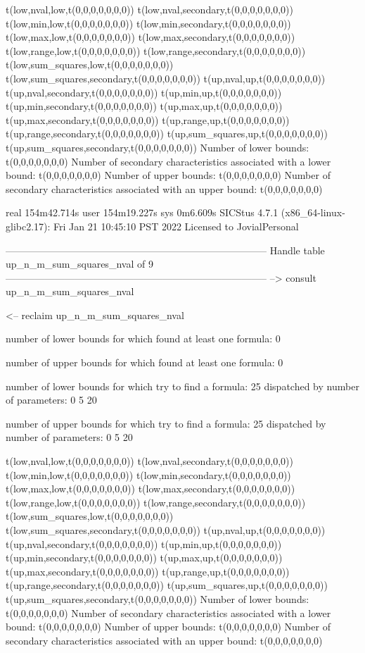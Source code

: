 t(low,nval,low,t(0,0,0,0,0,0,0))
t(low,nval,secondary,t(0,0,0,0,0,0,0))
t(low,min,low,t(0,0,0,0,0,0,0))
t(low,min,secondary,t(0,0,0,0,0,0,0))
t(low,max,low,t(0,0,0,0,0,0,0))
t(low,max,secondary,t(0,0,0,0,0,0,0))
t(low,range,low,t(0,0,0,0,0,0,0))
t(low,range,secondary,t(0,0,0,0,0,0,0))
t(low,sum_squares,low,t(0,0,0,0,0,0,0))
t(low,sum_squares,secondary,t(0,0,0,0,0,0,0))
t(up,nval,up,t(0,0,0,0,0,0,0))
t(up,nval,secondary,t(0,0,0,0,0,0,0))
t(up,min,up,t(0,0,0,0,0,0,0))
t(up,min,secondary,t(0,0,0,0,0,0,0))
t(up,max,up,t(0,0,0,0,0,0,0))
t(up,max,secondary,t(0,0,0,0,0,0,0))
t(up,range,up,t(0,0,0,0,0,0,0))
t(up,range,secondary,t(0,0,0,0,0,0,0))
t(up,sum_squares,up,t(0,0,0,0,0,0,0))
t(up,sum_squares,secondary,t(0,0,0,0,0,0,0))
Number of lower bounds:                                             t(0,0,0,0,0,0,0)
Number of secondary characteristics associated with a lower bound:  t(0,0,0,0,0,0,0)
Number of upper bounds:                                             t(0,0,0,0,0,0,0)
Number of secondary characteristics associated with an upper bound: t(0,0,0,0,0,0,0)

real	154m42.714s
user	154m19.227s
sys	0m6.609s
SICStus 4.7.1 (x86_64-linux-glibc2.17): Fri Jan 21 10:45:10 PST 2022
Licensed to JovialPersonal


--------------------------------------------------------------------------------
Handle table up_n_m_sum_squares_nval of 9
--------------------------------------------------------------------------------
--> consult up_n_m_sum_squares_nval

<-- reclaim up_n_m_sum_squares_nval

number of lower bounds for which found at least one formula: 0

number of upper bounds for which found at least one formula: 0

number of lower bounds for which try to find a formula: 25
dispatched by number of parameters: 0  5  20

number of upper bounds for which try to find a formula: 25
dispatched by number of parameters: 0  5  20

t(low,nval,low,t(0,0,0,0,0,0,0))
t(low,nval,secondary,t(0,0,0,0,0,0,0))
t(low,min,low,t(0,0,0,0,0,0,0))
t(low,min,secondary,t(0,0,0,0,0,0,0))
t(low,max,low,t(0,0,0,0,0,0,0))
t(low,max,secondary,t(0,0,0,0,0,0,0))
t(low,range,low,t(0,0,0,0,0,0,0))
t(low,range,secondary,t(0,0,0,0,0,0,0))
t(low,sum_squares,low,t(0,0,0,0,0,0,0))
t(low,sum_squares,secondary,t(0,0,0,0,0,0,0))
t(up,nval,up,t(0,0,0,0,0,0,0))
t(up,nval,secondary,t(0,0,0,0,0,0,0))
t(up,min,up,t(0,0,0,0,0,0,0))
t(up,min,secondary,t(0,0,0,0,0,0,0))
t(up,max,up,t(0,0,0,0,0,0,0))
t(up,max,secondary,t(0,0,0,0,0,0,0))
t(up,range,up,t(0,0,0,0,0,0,0))
t(up,range,secondary,t(0,0,0,0,0,0,0))
t(up,sum_squares,up,t(0,0,0,0,0,0,0))
t(up,sum_squares,secondary,t(0,0,0,0,0,0,0))
Number of lower bounds:                                             t(0,0,0,0,0,0,0)
Number of secondary characteristics associated with a lower bound:  t(0,0,0,0,0,0,0)
Number of upper bounds:                                             t(0,0,0,0,0,0,0)
Number of secondary characteristics associated with an upper bound: t(0,0,0,0,0,0,0)

